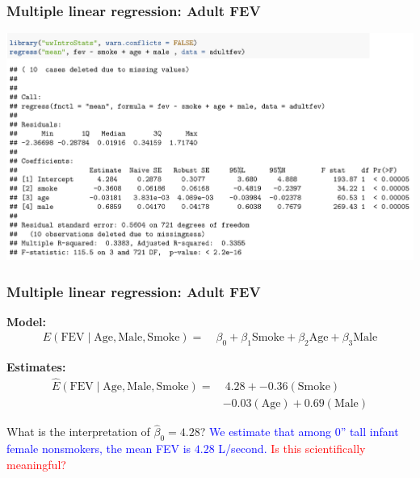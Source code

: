 \documentclass[12pt, 
hyperref={colorlinks=true, linkcolor=blue, urlcolor=cyan}]{beamer}
\begin{document}
\begin{frame}
\frametitle{Multiple linear regression: Adult FEV}
\begin{center}
\vspace{-1cm}\hspace*{-0.5cm}\includegraphics[width=1.1\textwidth]{plots/fev_vs_smoke_adjust_adultfev_noheight.png}
\end{center}
\end{frame}

\begin{frame}
\frametitle{Multiple linear regression: Adult FEV}
\vspace{-1cm}\textbf{Model:} {\small \begin{align*}
E(\text{FEV} \mid \text{Age}, \text{Male}, \text{Smoke}) =& \ \beta_0 + \beta_1 \text{Smoke} + \beta_2 \text{Age} + \beta_3 \text{Male} 
\end{align*} } \vspace{-1cm}

\textbf{Estimates:}
{\small \begin{align*}
\widehat{E}(\text{FEV} \mid \text{Age}, \text{Male}, \text{Smoke}) =& \ 4.28 + -0.36 (\text{Smoke}) \\
& -0.03 (\text{Age}) + 0.69 (\text{Male}) 
\end{align*} } \vspace{-1cm}

What is the interpretation of $\hat{\beta}_0 = 4.28$? \pause \textcolor{blue}{We estimate that among 0'' tall infant female nonsmokers, the mean FEV is $4.28$ L/second.} \textcolor{red}{Is this scientifically meaningful?}
\end{frame}
\end{document}
